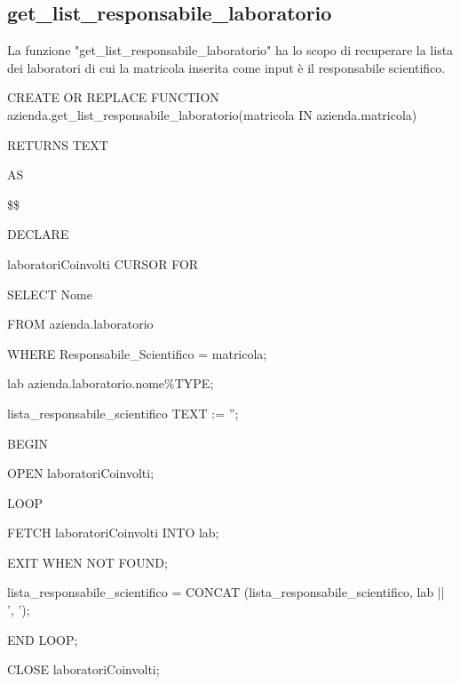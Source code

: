         \subsection{get\_list\_responsabile\_laboratorio}
        La funzione "get\_list\_responsabile\_laboratorio" ha lo scopo di recuperare la lista dei laboratori di cui la matricola inserita come input è il responsabile scientifico.
            \ttfamily
                \begin{flushleft}
                    \begin{description}
                        \item CREATE OR REPLACE FUNCTION azienda.get\_list\_responsabile\_laboratorio(matricola IN azienda.matricola) 
                        \item RETURNS TEXT      
                        \item AS
                        \item \$\$
                        \item DECLARE
                        \begin{description}
                            \item laboratoriCoinvolti CURSOR FOR
                            \begin{description}
                                \item SELECT Nome
                                \item FROM azienda.laboratorio
                                \item WHERE Responsabile\_Scientifico = matricola;
                            \end{description}
                            \item lab azienda.laboratorio.nome\%TYPE;
                            \item lista\_responsabile\_scientifico TEXT := '';
                        \end{description}
                        \item BEGIN 
                            \begin{description}
                                \item OPEN laboratoriCoinvolti;
                                \item LOOP
                                
                                \begin{description}
                                    \item FETCH laboratoriCoinvolti INTO lab;
                                    \item EXIT WHEN NOT FOUND;
                                    \item lista\_responsabile\_scientifico = CONCAT (lista\_responsabile\_scientifico, lab || ', ');
                                \end{description}
                                \item END LOOP;
                                \item CLOSE laboratoriCoinvolti;


\end{description}
\end{description}
\end{flushleft}
